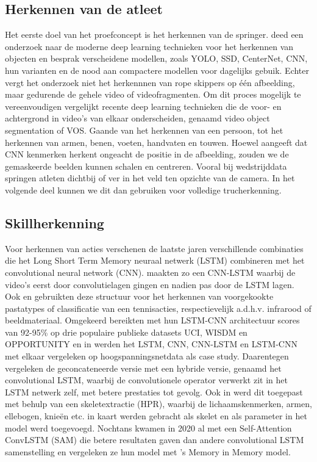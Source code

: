 \subsection{Herkennen van de atleet}
\label{subsec:herkennen van de atleet}

Het eerste doel van het proefconcept is het herkennen van de springer. \autocite{Zaidi_2021} deed een onderzoek naar de moderne deep learning technieken voor het herkennen van objecten en besprak verscheidene modellen, zoals YOLO, SSD, CenterNet, CNN, hun varianten en de nood aan compactere modellen voor dagelijks gebuik. Echter vergt het onderzoek niet het herkennnen van rope skippers op één afbeelding, maar gedurende de gehele video of videofragmenten. Om dit proces mogelijk te vereenvoudigen vergelijkt \textcite{Gao_2022} recente deep learning technieken die de voor- en achtergrond in video's van elkaar onderscheiden, genaamd video object segmentation of VOS. Gaande van het herkennen van een persoon, tot het herkennen van armen, benen, voeten, handvaten en touwen. Hoewel \textcite{Bharadiya_2023} aangeeft dat CNN kenmerken herkent ongeacht de positie in de afbeelding, zouden we de gemaskeerde beelden kunnen schalen en centreren. Vooral bij wedstrijddata springen atleten dichtbij of ver in het veld ten opzichte van de camera. In het volgende deel kunnen we dit dan gebruiken voor volledige trucherkenning.
    

\subsection{Skillherkenning}
\label{subsec:skillherkenning}

Voor herkennen van acties verschenen de laatste jaren verschillende combinaties die het Long Short Term Memory neuraal netwerk (LSTM) combineren met het convolutional neural network (CNN). \textcite{LUQMAN_2022} maakten zo een CNN-LSTM waarbij de video's eerst door convolutielagen gingen en nadien pas door de LSTM lagen. Ook \textcite{Sun_2023} en \textcite{Ullah_2024} gebruikten deze structuur voor het herkennen van voorgekookte pastatypes of classificatie van een tennisacties, respectievelijk a.d.h.v. infrarood of beeldmateriaal.
Omgekeerd bereikten \textcite{Xia_2020} met hun LSTM-CNN architectuur scores van 92-95\% op drie populaire publieke datasets UCI, WISDM en OPPORTUNITY en in \textcite{Aksan_2023} werden het LSTM, CNN, CNN-LSTM en LSTM-CNN met elkaar vergeleken op hoogspanningsnetdata als case study. Daarentegen vergeleken \textcite{Ellouze_2024} de geconcateneerde versie met een hybride versie, genaamd het convolutional LSTM, waarbij de convolutionele operator verwerkt zit in het LSTM netwerk zelf, met betere prestaties tot gevolg. Ook in \autocite{Sharma_2023} werd dit toegepast met behulp van een skeletextractie (HPR), waarbij de lichaamskenmerken, armen, ellebogen, knieën etc. in kaart werden gebracht als skelet en als parameter in het model werd toegevoegd. Nochtans kwamen \textcite{Lin_2020} in 2020 al met een Self-Attention ConvLSTM (SAM) die betere resultaten gaven dan andere convolutional LSTM samenstelling en vergeleken ze hun model met \textcite{Wang_2019}'s Memory in Memory model.

